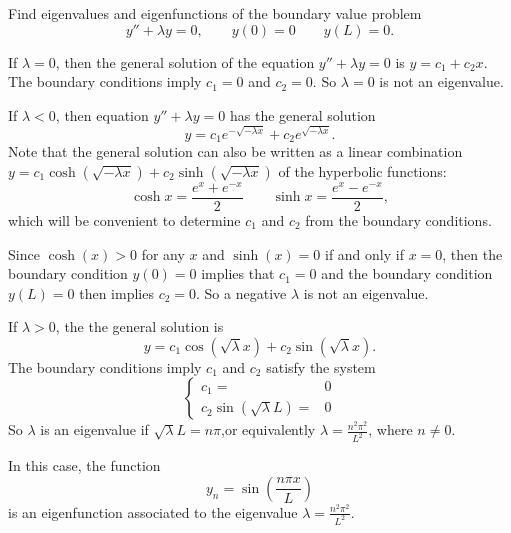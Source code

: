 \begin{example}
  Find eigenvalues and eigenfunctions of the boundary value problem
  \[
  y''+\lambda y=0, \qquad y(0)=0 \qquad y(L)=0.
\]
\end{example}
\begin{solution}
  If $\lambda =0$, then the general solution of the equation $y''+\lambda y=0$ is
  $y=c_1+c_2x$. The boundary conditions imply $c_1=0$ and $c_2=0$. So $\lambda=0$ is not an eigenvalue.
  
  If $\lambda<0$, then equation $y''+\lambda y=0$ has the general solution
  \[y=c_1e^{-\sqrt{-\lambda x}}+c_2e^{\sqrt{-\lambda x}}.\]
  Note that the general solution can also be written as  a linear combination $y=c_1\cosh(\sqrt{-\lambda x}) + c_2\sinh(\sqrt{-\lambda x}) $ of the hyperbolic functions:
  \[
    \cosh x=\frac{e^x+e^{-x}}{2}\qquad\sinh x=\frac{e^x-e^{-x}}{2},
  \]
  which will be convenient to determine $c_1$ and $c_2$ from the boundary conditions.

  Since $\cosh(x)>0$ for any $x$ and $\sinh(x)=0$ if and only if $x=0$, then the boundary condition $y(0)=0$ implies that $c_1=0$ and the boundary condition $y(L)=0$ then implies $c_2=0$. So a negative $\lambda$ is not an eigenvalue.

  If $\lambda>0$, the the general solution is 
  \[y=c_1\cos(\sqrt{\lambda} x)+c_2\sin(\sqrt{\lambda} x).\]
  The boundary conditions imply $c_1$ and $c_2$ satisfy the system
  \[
    \begin{cases}
      c_1=&0  \\
      c_2\sin(\sqrt{\lambda} L)=&0
    \end{cases}
  \]
  So $\lambda$ is an eigenvalue if $\sqrt{\lambda} L=n\pi$,or equivalently $\lambda=\frac{n^2\pi^2}{L^2}$, where  $n\neq 0$.

  In this case, the function
  \[y_n=\sin\left(\frac{n\pi x}{L}\right)\]
  is an eigenfunction associated to the eigenvalue $\lambda=\frac{n^2\pi^2}{L^2}$.
\end{solution}

